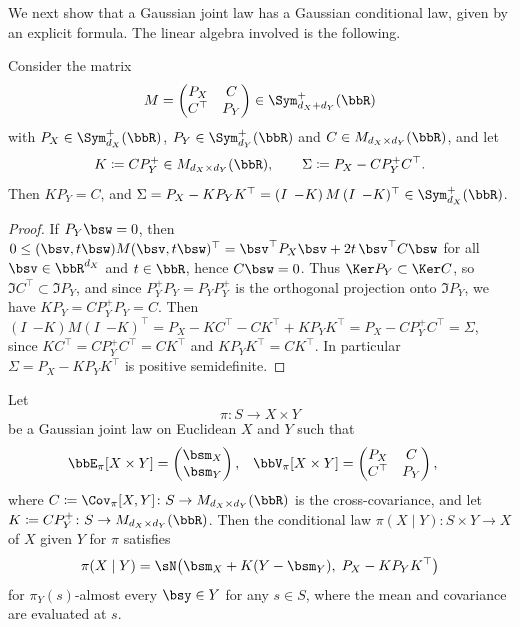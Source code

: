 \documentclass[12pt,reqno]{amsart}%
\theoremstyle{plain}
\theoremstyle{definition}
\def\R{\bbR}
\begin{document}
We next show that a Gaussian joint law has a Gaussian conditional law, given by an explicit formula.
The linear algebra involved is the following.

\begin{lemma}\label{lem: Schur}
	Consider the matrix
	\[
		M=\begin{pmatrix}P_X & C\\ C^{\top} & P_Y\end{pmatrix}\in\Sym^+_{d_X+d_Y}(\R)
	\]
	with $P_X\in\Sym^+_{d_X}(\R)$, $P_Y\in\Sym^+_{d_Y}(\R)$ and $C\in M_{d_X\times d_Y}(\R)$, and let
	\[
		K\coloneqq CP_Y^+\in M_{d_X\times d_Y}(\R),\qquad \Sigma\coloneqq P_X-CP_Y^+C^{\top}.
	\]
	Then $KP_Y=C$, and $\Sigma=P_X-KP_YK^{\top}=(I\;\,{-K})\,M\,(I\;\,{-K})^{\top}\in\Sym^+_{d_X}(\R)$.
\end{lemma}

\begin{proof}
	If $P_Y\bsw=0$, then $0\leq(\bsv,t\bsw)M(\bsv,t\bsw)^{\top}=\bsv^{\top}P_X\bsv+2t\,\bsv^{\top}C\bsw$
	for all $\bsv\in\R^{d_X}$ and $t\in\R$, hence $C\bsw=0$.
	Thus $\Ker P_Y\subset\Ker C$, so $\Im C^{\top}\subset\Im P_Y$, and since $P_Y^+P_Y=P_YP_Y^+$ is the orthogonal
	projection onto $\Im P_Y$, we have $KP_Y=CP_Y^+P_Y=C$.
	Then $(I\;\,{-K})M(I\;\,{-K})^{\top}=P_X-KC^{\top}-CK^{\top}+KP_YK^{\top}=P_X-CP_Y^+C^{\top}=\Sigma$,
	since $KC^{\top}=CP_Y^+C^{\top}=CK^{\top}$ and $KP_YK^{\top}=CK^{\top}$.
	In particular $\Sigma=P_X-KP_YK^{\top}$ is positive semidefinite.
\end{proof}

\begin{proposition}\label{prop: Gaussian conditioning}
	Let
	\[
		\pi\colon S\rightarrow X\times Y
	\]
	be a Gaussian joint law on Euclidean $X$ and $Y$ such that
	\begin{align*}
		\bbE_\pi[X\times Y]&=
		\begin{pmatrix} \bsm_X\\ \bsm_Y
		\end{pmatrix},  &
		\bbV_\pi[X\times Y]&=
		\begin{pmatrix}
			P_X  & C\\
			C^\top & P_Y
		\end{pmatrix},
	\end{align*}
	where $C\coloneqq\Cov_\pi[X,Y]\colon S\rightarrow M_{d_X\times d_Y}(\R)$ is the cross-covariance,
	and let $K\coloneqq CP_Y^+\colon S\rightarrow M_{d_X\times d_Y}(\R)$.
	Then the conditional law $\pi(X\mid Y)\colon S\times Y\rightarrow X$ of $X$ given $Y$ for $\pi$ satisfies
	\[
		\pi(X\mid Y)=\sN\bigl(\bsm_X+K(Y-\bsm_Y),\;P_X-KP_YK^{\top}\bigr)
	\]
	for $\pi_Y(s)$-almost every $\bsy\in Y$ for any $s\in S$,
	where the mean and covariance are evaluated at $s$.
\end{proposition}
\end{document}
